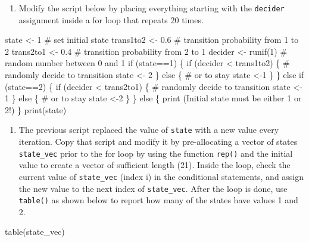\documentclass[
  letterpaper,
  DIV=11,
  numbers=noendperiod]{scrreprt}
\newenvironment{Shaded}{\begin{snugshade}}{\end{snugshade}}
\newcommand{\NormalTok}[1]{\textcolor[rgb]{0.00,0.23,0.31}{#1}}
\providecommand{\tightlist}{%
  \setlength{\itemsep}{0pt}\setlength{\parskip}{0pt}}\usepackage{longtable,booktabs,array}
\begin{document}
\begin{enumerate}
\def\labelenumi{\arabic{enumi}.}
\setcounter{enumi}{1}
\tightlist
\item
  Modify the script below by placing everything starting with the
  \texttt{decider} assignment inside a for loop that repeats 20 times.
\end{enumerate}

\begin{Shaded}
\begin{Highlighting}[]
\NormalTok{state \textless{}{-} 1 \# set initial state}
\NormalTok{trans1to2 \textless{}{-} 0.6 \# transition probability from 1 to 2}
\NormalTok{trans2to1 \textless{}{-} 0.4 \# transition probability from 2 to 1}
\NormalTok{decider \textless{}{-} runif(1) \# random number between 0 and 1}
\NormalTok{if (state==1) \{}
\NormalTok{    if (decider \textless{} trans1to2) \{ \# randomly decide to transition}
\NormalTok{        state \textless{}{-} 2}
\NormalTok{    \} else \{ \# or to stay}
\NormalTok{        state \textless{}{-}1}
\NormalTok{    \}}
\NormalTok{\} else if (state==2) \{}
\NormalTok{    if (decider \textless{} trans2to1) \{ \# randomly decide to transition}
\NormalTok{        state \textless{}{-} 1 }
\NormalTok{    \} else \{ \# or to stay}
\NormalTok{        state \textless{}{-}2}
\NormalTok{    \}}
\NormalTok{\} else \{}
\NormalTok{    print (\textquotesingle{}Initial state must be either 1 or 2!\textquotesingle{})}
\NormalTok{\}}
\NormalTok{print(state)}
\end{Highlighting}
\end{Shaded}

\begin{enumerate}
\def\labelenumi{\arabic{enumi}.}
\setcounter{enumi}{2}
\tightlist
\item
  The previous script replaced the value of \texttt{state} with a new
  value every iteration. Copy that script and modify it by
  pre-allocating a vector of states \texttt{state\_vec} prior to the for
  loop by using the function \texttt{rep()} and the initial value to
  create a vector of sufficient length (21). Inside the loop, check the
  current value of \texttt{state\_vec} (index i) in the conditional
  statements, and assign the new value to the next index of
  \texttt{state\_vec}. After the loop is done, use \texttt{table()} as
  shown below to report how many of the states have values 1 and 2.
\end{enumerate}

\begin{Shaded}
\begin{Highlighting}[]

\NormalTok{table(state\_vec)}
\end{Highlighting}
\end{Shaded}
\end{document}
